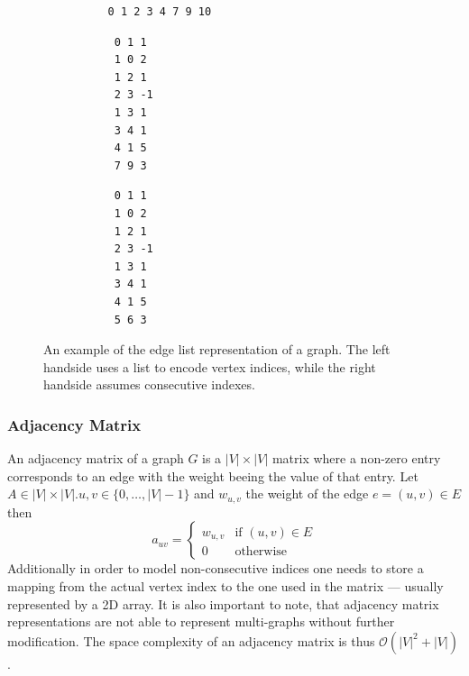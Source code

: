         \begin{figure}[htp]
         \begin{center}
         \begin{minipage}{0.5\textwidth}
         \begin{verbatim}
          0 1 2 3 4 7 9 10
          \end{verbatim}
          \begin{verbatim}
           0 1 1
           1 0 2
           1 2 1
           2 3 -1
           1 3 1
           3 4 1
           4 1 5
           7 9 3
          \end{verbatim}
         \end{minipage}%
         \hfill%
         \begin{minipage}{0.5\textwidth}
          \begin{verbatim}
           0 1 1
           1 0 2
           1 2 1
           2 3 -1
           1 3 1
           3 4 1
           4 1 5
           5 6 3
          \end{verbatim}
         \end{minipage}
         \end{center}
         \caption{%
             An example of the edge list representation of a graph.%
             The left handside uses a list to encode vertex indices, while the right handside assumes consecutive indexes.%
        }
        \label{edgelist}
        \end{figure}

        \subsubsection*{Adjacency Matrix}
        An adjacency matrix of a graph $G$ is a $|V|\times|V|$ matrix where a non-zero entry corresponds to an edge with the weight beeing the value of that entry. 
        Let $A \in |V|\times|V|. u, v \in \{0, \dots, |V| - 1\}$ and $w_{u,v}$ the weight of the edge $e = (u,v) \in E$ then
        \[ a_{uv} = \begin{cases}
                     w_{u,v} & \text{if } (u,v) \in E \\
                     0 & \text{otherwise}
                    \end{cases}
        \]
        Additionally in order to model non-consecutive indices one needs to store a mapping from the actual vertex index to the one used in the matrix --- usually represented by a 2D array. 
        It is also important to note, that adjacency matrix representations are not able to represent multi-graphs without further modification.
        The space complexity of an adjacency matrix is thus $\mathcal{O}(|V|^2 + |V|)$.
                

